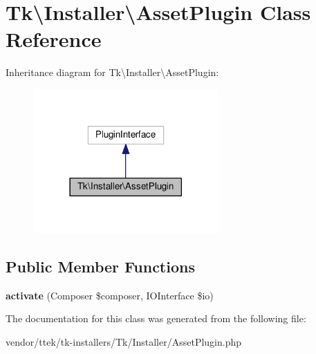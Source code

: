 \hypertarget{classTk_1_1Installer_1_1AssetPlugin}{\section{Tk\textbackslash{}Installer\textbackslash{}Asset\+Plugin Class Reference}
\label{classTk_1_1Installer_1_1AssetPlugin}
}


Inheritance diagram for Tk\textbackslash{}Installer\textbackslash{}Asset\+Plugin\+:\nopagebreak
\begin{figure}[H]
\begin{center}
\leavevmode
\includegraphics[width=201pt]{classTk_1_1Installer_1_1AssetPlugin__inherit__graph}
\end{center}
\end{figure}
\subsection*{Public Member Functions}
\begin{DoxyCompactItemize}
\item 
\hypertarget{classTk_1_1Installer_1_1AssetPlugin_a81d4cccef9792f534f1669276617c303}{{\bfseries activate} (Composer \$composer, I\+O\+Interface \$io)}\label{classTk_1_1Installer_1_1AssetPlugin_a81d4cccef9792f534f1669276617c303}

\end{DoxyCompactItemize}


The documentation for this class was generated from the following file\+:\begin{DoxyCompactItemize}
\item 
vendor/ttek/tk-\/installers/\+Tk/\+Installer/Asset\+Plugin.\+php\end{DoxyCompactItemize}
